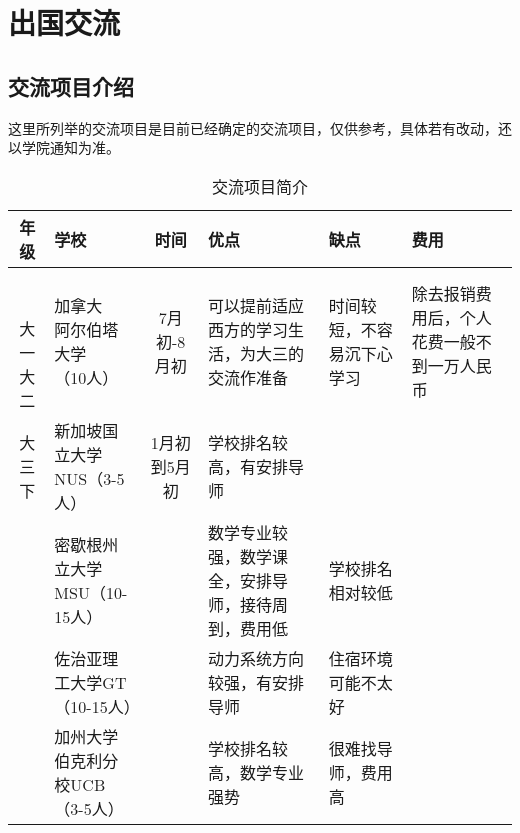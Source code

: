 \section{出国交流}

\subsection{交流项目介绍}
    这里所列举的交流项目是目前已经确定的交流项目，仅供参考，具体若有改动，还以学院通知为准。
\begin{table}
    \begin{tabular}{c|p{3cm}|c|p{3cm}|p{3cm}|p{3cm}}
        \hline
        \hline
        年级  &  学校  & 时间  &  优点  &  缺点  &  费用\\ \hline
        \tabincell{c}{ \\\\大一\\大二} & \tabincell{c}{ 加拿大\\阿尔伯塔大学\\（10人）} & 7月初-8月初  
                & 可以提前适应西方的学习生活，为大三的交流作准备 & 时间较短，不容易沉下心学习 & 除去报销费用后，个人花费一般不到一万人民币\\ \hline
        大三下 & 新加坡国立大学NUS（3-5人） & 1月初到5月初 & 学校排名较高，有安排导师 &  &   \\ \hline
                & 密歇根州立大学MSU（10-15人） &     & 数学专业较强，数学课全，安排导师，接待周到，费用低 & 学校排名相对较低  &  \\ \hline
                & 佐治亚理工大学GT（10-15人） &     &动力系统方向较强，有安排导师 & 住宿环境可能不太好 &  \\ \hline
                & 加州大学伯克利分校UCB（3-5人） &   & 学校排名较高，数学专业强势 & 很难找导师，费用高 & \\ 
                \hline
                \hline
    \end{tabular}
    \caption{交流项目简介}
    \label{ex-pro}
\end{table}


